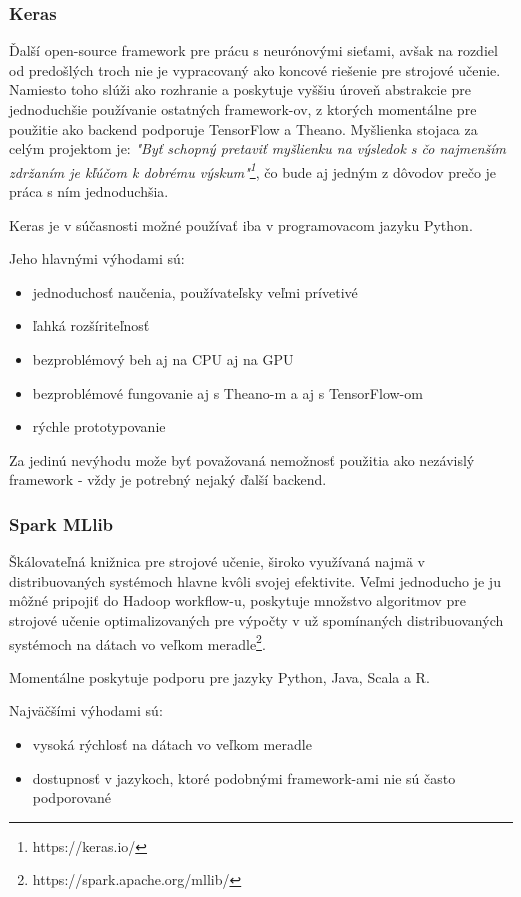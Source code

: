 \subsubsection{Keras}\label{keras}

Ďalší open-source framework pre prácu s neurónovými sieťami, avšak na rozdiel od predošlých troch nie je vypracovaný ako koncové riešenie pre strojové učenie. Namiesto toho slúži ako rozhranie a poskytuje vyššiu úroveň abstrakcie pre jednoduchšie používanie ostatných framework-ov, z ktorých momentálne pre použitie ako backend podporuje TensorFlow a Theano. Myšlienka stojaca za celým projektom je: \textit{"Byť schopný pretaviť myšlienku na výsledok s čo najmenším zdržaním je kľúčom k dobrému výskum"\footnote{https://keras.io/}}, čo bude aj jedným z dôvodov prečo je práca s ním jednoduchšia.

Keras je v súčasnosti možné používať iba v programovacom jazyku Python.

Jeho hlavnými výhodami sú:
\begin{itemize}
	\item jednoduchosť naučenia, používateľsky veľmi prívetivé
	\item ľahká rozšíriteľnosť
	\item bezproblémový beh aj na CPU aj na GPU
	\item bezproblémové fungovanie aj s Theano-m a aj s TensorFlow-om
	\item rýchle prototypovanie
\end{itemize}

Za jedinú nevýhodu može byť považovaná nemožnosť použitia ako nezávislý framework - vždy je potrebný nejaký ďalší backend.

\subsubsection{Spark MLlib}

Škálovateľná knižnica pre strojové učenie, široko využívaná najmä v distribuovaných systémoch hlavne kvôli svojej efektivite. Veľmi jednoducho je ju môžné pripojiť do Hadoop workflow-u, poskytuje množstvo algoritmov pre strojové učenie optimalizovaných pre výpočty v už spomínaných distribuovaných systémoch na dátach vo veľkom meradle\footnote{https://spark.apache.org/mllib/}.

Momentálne poskytuje podporu pre jazyky Python, Java, Scala a R.

Najväčšími výhodami sú:
\begin{itemize}
	\item vysoká rýchlosť na dátach vo veľkom meradle
	\item dostupnosť v jazykoch, ktoré podobnými framework-ami nie sú často podporované
\end{itemize}

